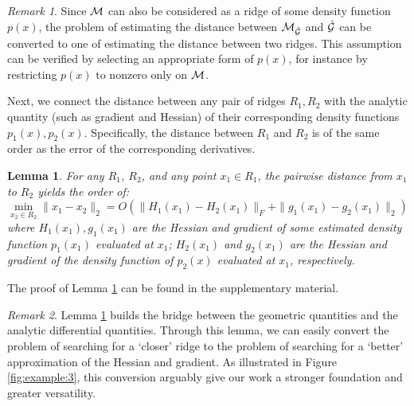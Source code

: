 \documentclass[aos,preprint]{imsart}
\newtheorem{lemma}[theorem]{Lemma}
\theoremstyle{remark}
\newtheorem*{remark}{Remark}
\begin{document}
\begin{remark}
Since $\cal M$ can also be considered  as a ridge of some density function $p(x)$, the problem of estimating the distance between $\cal M_{\hat{\cal G}}$ and $\hat{\cal G}$ can be converted to one of estimating the distance between two ridges. 
This assumption can be verified by selecting an appropriate form of $p(x)$, for instance by restricting $p(x)$ to nonzero only on $\cal M$. 
\end{remark}
Next, we connect the distance between any pair of ridges $R_1, R_2$ with the analytic quantity (such as gradient and Hessian) of their corresponding density functions $p_1(x), p_2(x)$. 
Specifically, the  distance between $R_1$ and $R_2$ is of the same order as the error of the corresponding derivatives. 
\begin{lemma}{ 
For any $R_1$, $R_2$, and any point $x_1\in R_1$, the pairwise distance from $x_1$ to $R_2$ yields the order of: %
\[
\min_{x_2\in R_2}\|x_1-x_2\|_2 = O(\|H_1(x_1)-H_2(x_1)\|_F+\|g_1(x_1)-g_2(x_1)\|_2)
\]
where $H_1(x_1), g_1 (x_1)$ are the Hessian and gradient of some estimated density function $p_1(x_1)$ evaluated at $x_1$; $H_2(x_1)$ and $g_2(x_1)$ are the Hessian and gradient of the density function of $p_2(x)$ evaluated at $x_1$, respectively.
 }\label{margin}
\end{lemma}
The proof of Lemma \ref{margin} can be found in the supplementary material.%
\begin{remark}
Lemma \ref{margin} builds the bridge between the geometric quantities and the analytic differential quantities. Through this lemma, we can easily convert the problem of searching for a `closer' ridge to the problem of searching for a `better' approximation of the Hessian and gradient. As illustrated in Figure \ref{fig:example:3}, this conversion arguably give our work a stronger foundation and greater versatility.
\end{remark}
\end{document}
